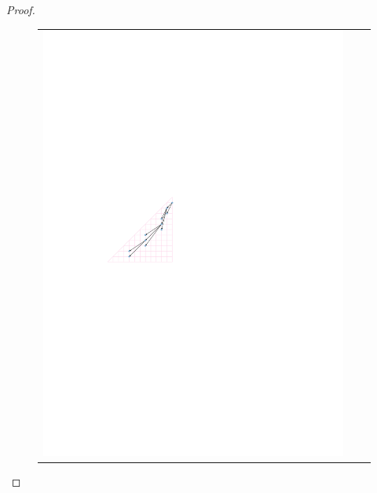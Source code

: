 \documentclass{patmorin}
\begin{document}
\begin{proof}
\begin{figure}
{\begin{tabular}{ccc}
         \includegraphics{figs/four-colouring-2} &

\end{tabular}}
\end{figure}
\end{proof}
\end{document}

